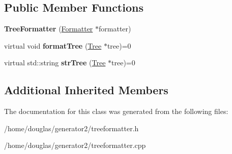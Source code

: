 \subsection*{Public Member Functions}
\begin{DoxyCompactItemize}
\item 
{\bfseries Tree\+Formatter} (\hyperlink{classFormatter}{Formatter} $\ast$formatter)\hypertarget{classTreeFormatter_af0a3718db3882f4c068938a46bea34d0}{}\label{classTreeFormatter_af0a3718db3882f4c068938a46bea34d0}

\item 
virtual void {\bfseries format\+Tree} (\hyperlink{classTree}{Tree} $\ast$tree)=0\hypertarget{classTreeFormatter_a69bffd6b58f945925e3259663bf40e95}{}\label{classTreeFormatter_a69bffd6b58f945925e3259663bf40e95}

\item 
virtual std\+::string {\bfseries str\+Tree} (\hyperlink{classTree}{Tree} $\ast$tree)=0\hypertarget{classTreeFormatter_a5c49dc030f66b7ca024fa640c3fc46e6}{}\label{classTreeFormatter_a5c49dc030f66b7ca024fa640c3fc46e6}

\end{DoxyCompactItemize}
\subsection*{Additional Inherited Members}


The documentation for this class was generated from the following files\+:\begin{DoxyCompactItemize}
\item 
/home/douglas/generator2/treeformatter.\+h\item 
/home/douglas/generator2/treeformatter.\+cpp\end{DoxyCompactItemize}
